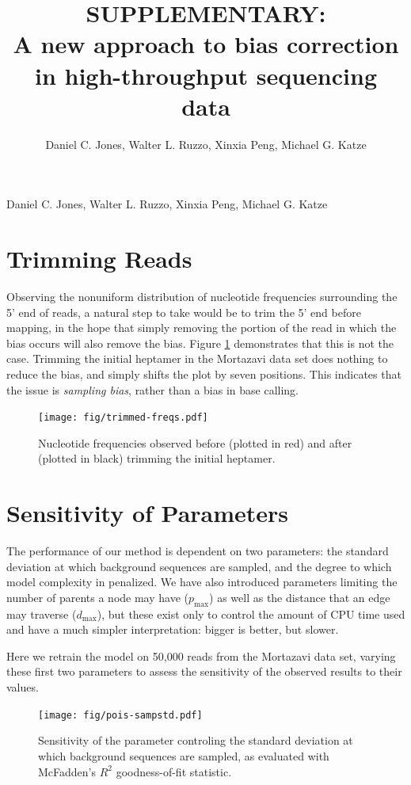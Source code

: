 \documentclass[letterpaper]{article}
\title{SUPPLEMENTARY:\\A new approach to bias correction in high-throughput sequencing data}
\author{Daniel C. Jones, Walter L. Ruzzo, Xinxia Peng, Michael G. Katze}
\begin{document}
{}
{Daniel C. Jones, Walter L. Ruzzo, Xinxia Peng, Michael G. Katze}


\section{Trimming Reads}

Observing the nonuniform distribution of nucleotide frequencies surrounding the
5' end of reads, a natural step to take would be to trim the 5' end before
mapping, in the hope that simply removing the portion of the read in which the
bias occurs will also remove the bias. Figure \ref{fig:trimmedfreqs}
demonstrates that this is not the case. Trimming the initial heptamer in the
Mortazavi data set does nothing to reduce the bias, and simply shifts the plot
by seven positions. This indicates that the issue is \emph{sampling bias},
rather than a bias in base calling.

\begin{figure}[H]
\begin{center}
\texttt{[image: fig/trimmed-freqs.pdf]}
\end{center}
\caption{Nucleotide frequencies observed before (plotted in red) and after
(plotted in black) trimming the initial heptamer.}
\label{fig:trimmedfreqs}
\end{figure}


\section{Sensitivity of Parameters}

The performance of our method is dependent on two parameters: the standard
deviation at which background sequences are sampled, and the degree to which
model complexity in penalized. We have also introduced parameters limiting the
number of parents a node may have ($p_{\text{max}}$) as well as the distance
that an edge may traverse ($d_{\text{max}}$), but these exist only to control
the amount of CPU time used and have a much simpler interpretation: bigger is
better, but slower.

Here we retrain the model on 50,000 reads from the Mortazavi data
set, varying these first two parameters to assess the sensitivity of the
observed results to their values.

\begin{figure}[H]
\begin{center}
\texttt{[image: fig/pois-sampstd.pdf]}
\end{center}
\caption{Sensitivity of the parameter controling the standard deviation at which
background sequences are sampled, as evaluated with McFadden's $R^2$
goodness-of-fit statistic.}
\label{fig:poissampstd}
\end{figure}
\end{document}
